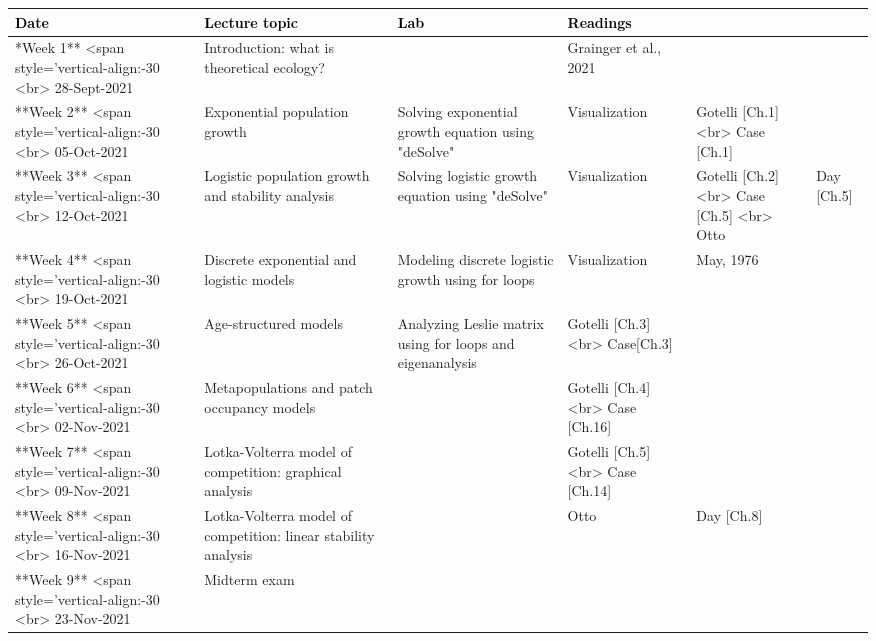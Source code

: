\documentclass[
]{book}
\begin{document}
\begin{tabu} to 
\hline
\begingroup\fontsize{20}{22}\selectfont \textcolor{black}{\textbf{Date}}\endgroup & \begingroup\fontsize{20}{22}\selectfont \textcolor{black}{\textbf{Lecture topic}}\endgroup & \begingroup\fontsize{20}{22}\selectfont \textcolor{black}{\textbf{Lab}}\endgroup & \begingroup\fontsize{20}{22}\selectfont \textcolor{black}{\textbf{Readings}}\endgroup\\
\hline
**Week 1** <span style='vertical-align:-30%
           <br> 28-Sept-2021 & Introduction: what is theoretical ecology? & \- & Grainger et al., 2021\\
\hline
**Week 2** <span style='vertical-align:-30%
           <br> 05-Oct-2021 & Exponential population growth & Solving exponential growth equation using "deSolve" & Visualization & Gotelli [Ch.1] <br> Case [Ch.1]\\
\hline
**Week 3** <span style='vertical-align:-30%
           <br> 12-Oct-2021 & Logistic population growth and stability analysis & Solving logistic growth equation using "deSolve" & Visualization & Gotelli [Ch.2] <br> Case [Ch.5] <br> Otto & Day [Ch.5]\\
\hline
**Week 4** <span style='vertical-align:-30%
           <br> 19-Oct-2021 & Discrete exponential and logistic models & Modeling discrete logistic growth using for loops & Visualization & May, 1976\\
\hline
**Week 5** <span style='vertical-align:-30%
           <br> 26-Oct-2021 & Age-structured models & Analyzing Leslie matrix using for loops and eigenanalysis & Gotelli [Ch.3] <br> Case[Ch.3]\\
\hline
**Week 6** <span style='vertical-align:-30%
           <br> 02-Nov-2021 & Metapopulations and patch occupancy models &  & Gotelli [Ch.4] <br> Case [Ch.16]\\
\hline
**Week 7** <span style='vertical-align:-30%
           <br> 09-Nov-2021 & Lotka-Volterra model of competition: graphical analysis &  & Gotelli [Ch.5] <br> Case [Ch.14]\\
\hline
**Week 8** <span style='vertical-align:-30%
           <br> 16-Nov-2021 & Lotka-Volterra model of competition: linear stability analysis &  & Otto & Day [Ch.8]\\
\hline
**Week 9** <span style='vertical-align:-30%
           <br> 23-Nov-2021 & Midterm exam & \- & $~~~~~~~~~~~~$ \-\\

\end{tabu}
\end{document}
